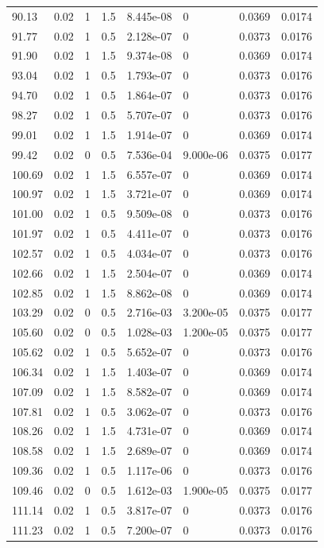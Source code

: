 \documentclass[preview]{standalone}
\begin{document}
{{{\begin{tabular}{L{1.2cm}C{1.2cm} C{0.3cm}C{0.5cm} C{1.4cm}C{1.4cm} C{1.4cm}C{1.4cm}}
  90.13  &  0.02  & 1     & 1.5 &  8.445e-08  & 0  & 0.0369 &  0.0174   \\ 
  91.77  &  0.02  & 1     & 0.5 &  2.128e-07  & 0  & 0.0373 &  0.0176   \\ 
  91.90  &  0.02  & 1     & 1.5 &  9.374e-08  & 0  & 0.0369 &  0.0174   \\ 
  93.04  &  0.02  & 1     & 0.5 &  1.793e-07  & 0  & 0.0373 &  0.0176   \\ 
  94.70  &  0.02  & 1     & 0.5 &  1.864e-07  & 0  & 0.0373 &  0.0176   \\ 
  98.27  &  0.02  & 1     & 0.5 &  5.707e-07  & 0  & 0.0373 &  0.0176   \\ 
  99.01  &  0.02  & 1     & 1.5 &  1.914e-07  & 0  & 0.0369 &  0.0174   \\ 
  99.42  &  0.02  & 0     & 0.5 &  7.536e-04  & 9.000e-06  & 0.0375 &  0.0177   \\ 
  100.69  &  0.02  & 1     & 1.5 &  6.557e-07  & 0  & 0.0369 &  0.0174   \\ 
  100.97  &  0.02  & 1     & 1.5 &  3.721e-07  & 0  & 0.0369 &  0.0174   \\ 
  101.00  &  0.02  & 1     & 0.5 &  9.509e-08  & 0  & 0.0373 &  0.0176   \\ 
  101.97  &  0.02  & 1     & 0.5 &  4.411e-07  & 0  & 0.0373 &  0.0176   \\ 
  102.57  &  0.02  & 1     & 0.5 &  4.034e-07  & 0  & 0.0373 &  0.0176   \\ 
  102.66  &  0.02  & 1     & 1.5 &  2.504e-07  & 0  & 0.0369 &  0.0174   \\ 
  102.85  &  0.02  & 1     & 1.5 &  8.862e-08  & 0  & 0.0369 &  0.0174   \\ 
  103.29  &  0.02  & 0     & 0.5 &  2.716e-03  & 3.200e-05  & 0.0375 &  0.0177   \\ 
  105.60  &  0.02  & 0     & 0.5 &  1.028e-03  & 1.200e-05  & 0.0375 &  0.0177   \\ 
  105.62  &  0.02  & 1     & 0.5 &  5.652e-07  & 0  & 0.0373 &  0.0176   \\ 
  106.34  &  0.02  & 1     & 1.5 &  1.403e-07  & 0  & 0.0369 &  0.0174   \\ 
  107.09  &  0.02  & 1     & 1.5 &  8.582e-07  & 0  & 0.0369 &  0.0174   \\ 
  107.81  &  0.02  & 1     & 0.5 &  3.062e-07  & 0  & 0.0373 &  0.0176   \\ 
  108.26  &  0.02  & 1     & 1.5 &  4.731e-07  & 0  & 0.0369 &  0.0174   \\ 
  108.58  &  0.02  & 1     & 1.5 &  2.689e-07  & 0  & 0.0369 &  0.0174   \\ 
  109.36  &  0.02  & 1     & 0.5 &  1.117e-06  & 0  & 0.0373 &  0.0176   \\ 
  109.46  &  0.02  & 0     & 0.5 &  1.612e-03  & 1.900e-05  & 0.0375 &  0.0177   \\ 
  111.14  &  0.02  & 1     & 0.5 &  3.817e-07  & 0  & 0.0373 &  0.0176   \\ 
  111.23  &  0.02  & 1     & 0.5 &  7.200e-07  & 0  & 0.0373 &  0.0176   \\ 
\hline 
\end{tabular} 

}}}
\end{document}
